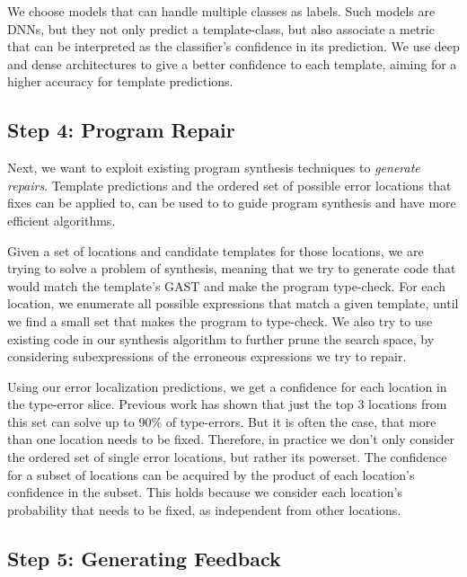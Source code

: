  We choose models that can handle multiple
classes as labels. Such models are DNNs, but they not only predict a
template-class, but also associate a metric that can be interpreted as the
classifier’s confidence in its prediction. We use deep and dense architectures
to give a better confidence to each template, aiming for a higher accuracy for
template predictions.



\subsection{Step 4: Program Repair}
\label{subsec:step4}

Next, we want to exploit existing program synthesis techniques to \emph{generate
repairs}. Template predictions and the ordered set of possible error locations
that fixes can be applied to, can be used to to guide program synthesis and have
more efficient algorithms.

 Given a set of locations and candidate templates for
those locations, we are trying to solve a problem of synthesis, meaning that we
try to generate code that would match the template’s GAST and make the program
type-check. For each location, we enumerate all possible expressions that match
a given template, until we find a small set that makes the program to
type-check. We also try to use existing code in our synthesis algorithm to
further prune the search space, by considering subexpressions of the erroneous
expressions we try to repair.

 Using our error localization
predictions, we get a confidence for each location in the type-error slice.
Previous work has shown that just the top 3 locations from this set can solve up
to 90\% of type-errors. But it is often the case, that more than one location
needs to be fixed. Therefore, in practice we don't only consider the ordered set
of single error locations, but rather its powerset. The confidence for a subset
of locations can be acquired by the product of each location’s confidence in the
subset. This holds because we consider each location’s probability that needs to
be fixed, as independent from other locations.



\subsection{Step 5: Generating Feedback}
\label{subsec:step5}

